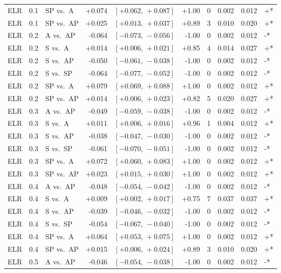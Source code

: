 \begin{landscape}
\begin{scriptsize}
\begin{longtable}{lllrrrrrrl}
ELR & 0.1 & SP vs.\ A & +0.074 & $[+0.062,\,+0.087]$ & +1.00 & 0 & 0.002 & 0.012 & +* \\
ELR & 0.1 & SP vs.\ AP & +0.025 & $[+0.013,\,+0.037]$ & +0.89 & 3 & 0.010 & 0.020 & +* \\
ELR & 0.2 & A vs.\ AP & -0.064 & $[-0.073,\,-0.056]$ & -1.00 & 0 & 0.002 & 0.012 & -* \\
ELR & 0.2 & S vs.\ A & +0.014 & $[+0.006,\,+0.021]$ & +0.85 & 4 & 0.014 & 0.027 & +* \\
ELR & 0.2 & S vs.\ AP & -0.050 & $[-0.061,\,-0.038]$ & -1.00 & 0 & 0.002 & 0.012 & -* \\
ELR & 0.2 & S vs.\ SP & -0.064 & $[-0.077,\,-0.052]$ & -1.00 & 0 & 0.002 & 0.012 & -* \\
ELR & 0.2 & SP vs.\ A & +0.079 & $[+0.069,\,+0.088]$ & +1.00 & 0 & 0.002 & 0.012 & +* \\
ELR & 0.2 & SP vs.\ AP & +0.014 & $[+0.006,\,+0.023]$ & +0.82 & 5 & 0.020 & 0.027 & +* \\
ELR & 0.3 & A vs.\ AP & -0.049 & $[-0.059,\,-0.038]$ & -1.00 & 0 & 0.002 & 0.012 & -* \\
ELR & 0.3 & S vs.\ A & +0.011 & $[+0.006,\,+0.016]$ & +0.96 & 1 & 0.004 & 0.012 & +* \\
ELR & 0.3 & S vs.\ AP & -0.038 & $[-0.047,\,-0.030]$ & -1.00 & 0 & 0.002 & 0.012 & -* \\
ELR & 0.3 & S vs.\ SP & -0.061 & $[-0.070,\,-0.051]$ & -1.00 & 0 & 0.002 & 0.012 & -* \\
ELR & 0.3 & SP vs.\ A & +0.072 & $[+0.060,\,+0.083]$ & +1.00 & 0 & 0.002 & 0.012 & +* \\
ELR & 0.3 & SP vs.\ AP & +0.023 & $[+0.015,\,+0.030]$ & +1.00 & 0 & 0.002 & 0.012 & +* \\
ELR & 0.4 & A vs.\ AP & -0.048 & $[-0.054,\,-0.042]$ & -1.00 & 0 & 0.002 & 0.012 & -* \\
ELR & 0.4 & S vs.\ A & +0.009 & $[+0.002,\,+0.017]$ & +0.75 & 7 & 0.037 & 0.037 & +* \\
ELR & 0.4 & S vs.\ AP & -0.039 & $[-0.046,\,-0.032]$ & -1.00 & 0 & 0.002 & 0.012 & -* \\
ELR & 0.4 & S vs.\ SP & -0.054 & $[-0.067,\,-0.040]$ & -1.00 & 0 & 0.002 & 0.012 & -* \\
ELR & 0.4 & SP vs.\ A & +0.064 & $[+0.053,\,+0.075]$ & +1.00 & 0 & 0.002 & 0.012 & +* \\
ELR & 0.4 & SP vs.\ AP & +0.015 & $[+0.006,\,+0.024]$ & +0.89 & 3 & 0.010 & 0.020 & +* \\
ELR & 0.5 & A vs.\ AP & -0.046 & $[-0.054,\,-0.038]$ & -1.00 & 0 & 0.002 & 0.012 & -* \\

\end{longtable}
\end{scriptsize}
\end{landscape}
